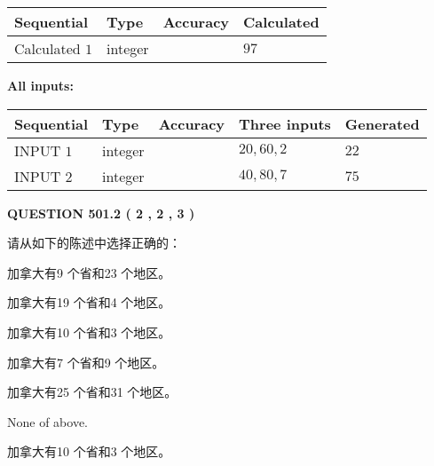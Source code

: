 \documentclass{ctexart}
\begin{document}
  
\noindent\begin{tabular}{|l|l|l|l|}
\hline
 Sequential & Type & Accuracy & Calculated \\ 
\hline
 
 
  Calculated $  1 $ & integer &  & 
  $ 97 $ 
 \\  \hline  
 \end{tabular}
   
   
   
   
\noindent\vspace{0.1in}\hspace{-0.08in} {\textbf{\Large{All inputs: }}}
   
   
  
  
\noindent\begin{tabular}{|l|l|l|l|l|}
\hline
 Sequential & Type & Accuracy & Three inputs & Generated \\ 
\hline
 
 
  INPUT $  1 $ & integer &  & $
 20
 , 
 60
 , 
 2
 $ & $ 22 $ 
 \\  \hline  
 
 
  INPUT $  2 $ & integer &  & $
 40
 , 
 80
 , 
 7
 $ & $ 75 $ 
 \\  \hline  
 \end{tabular}
   
   
  
\vspace{0.2in}
  
{\textbf{\Large{QUESTION
501.2 
 ( 2 , 2 , 3 )
}}}
  
  
请从如下的陈述中选择正确的：
 
 
加拿大有9 个省和23 个地区。
 
 
加拿大有19 个省和4 个地区。
 
 
加拿大有10 个省和3 个地区。
 
 
加拿大有7 个省和9 个地区。
 
 
加拿大有25 个省和31 个地区。
 
 
 None of above.
 
 
\noindent{}
 
 
加拿大有10 个省和3 个地区。
 
 
\noindent{}
 
\end{document}
